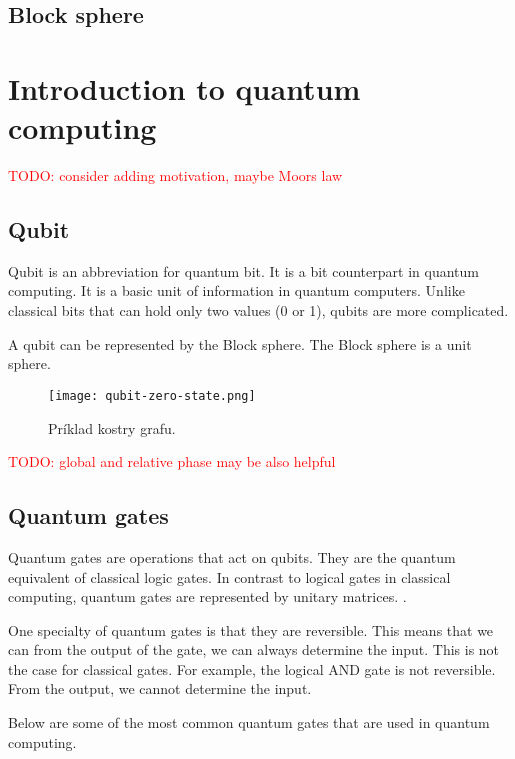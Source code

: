 \subsection{Block sphere} 

\section{Introduction to quantum computing}
\textcolor{red}{TODO: consider adding motivation, maybe Moors law}

\subsection{Qubit}
Qubit is an abbreviation for quantum bit. It is a bit counterpart in quantum computing. It is a basic unit of information in quantum computers. Unlike classical bits that can hold only two values (0 or 1), qubits are more complicated. 

A qubit can be represented by the Block sphere. The Block sphere is a unit sphere. 

\begin{figure}[hbt!]
    \begin{center}
       \texttt{[image: qubit-zero-state.png]}
       \caption{Príklad kostry grafu.}\label{fig:kostra}
    \end{center}
  \end{figure} 
\textcolor{red}{TODO: global and relative phase may be also helpful}

\subsection{Quantum gates}
Quantum gates are operations that act on qubits. They are the quantum equivalent of classical logic gates. In contrast to logical gates in classical computing, quantum gates are represented by unitary matrices. .

One specialty of quantum gates is that they are reversible. This means that we can from the output of the gate, we can always determine the input. This is not the case for classical gates. For example, the logical AND gate is not reversible. From the output, we cannot determine the input.

Below are some of the most common quantum gates that are used in quantum computing.
